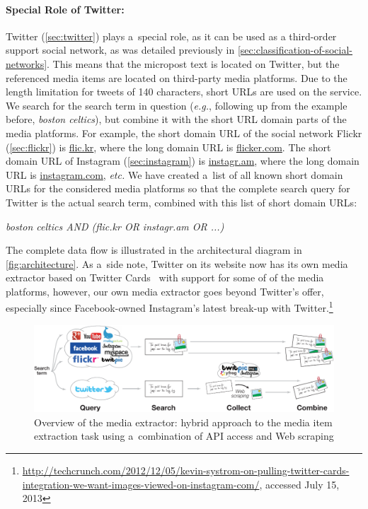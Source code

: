 \paragraph{Special Role of Twitter:}

Twitter (\autoref{sec:twitter})
plays a~special role, as it can be used as
a third-order support social network,
as was detailed previously in \autoref{sec:classification-of-social-networks}.
This means that the micropost text is located on Twitter,
but the referenced media items are located
on third-party media platforms.
Due to the length limitation for tweets of 140 characters,
short URLs are used on the service.
We search for the search term in question (\emph{e.g.},
following up from the example before, \emph{boston celtics}),
but combine it with the short URL domain parts of
the media platforms.
For example, the short domain URL of the social network Flickr 
(\autoref{sec:flickr})
is \url{flic.kr}, where the long domain URL is \url{flicker.com}.
The short domain URL of Instagram 
(\autoref{sec:instagram}) is \url{instagr.am},
where the long domain URL is \url{instagram.com}, \emph{etc.}
We have created a~list of all known short domain URLs for the 
considered media platforms so that the complete search query
for Twitter is the actual search term,
combined with this list of short domain URLs:

\emph{boston celtics AND (flic.kr OR instagr.am OR ...)}

\noindent The complete data flow is illustrated in the
architectural diagram in \autoref{fig:architecture}.
As a~side note, Twitter on its website now has its own
media extractor based on Twitter Cards~\cite{wang2012twitter}
with support for some of of the media platforms,
however, our own media extractor goes beyond Twitter's offer,
especially since Facebook-owned Instagram's latest break-up with
Twitter.\footnote{\url{http://techcrunch.com/2012/12/05/kevin-systrom-on-pulling-twitter-cards-integration-we-want-images-viewed-on-instagram-com/}, accessed July 15, 2013}

\begin{figure}
  \centering
  \includegraphics[width=1.0\linewidth]{architecture.pdf}
  \caption[Overview of the media extractor]
    {Overview of the media extractor:
    hybrid approach to the media item extraction task using
    a~combination of API access and Web scraping}
  \label{fig:architecture}
\end{figure}

